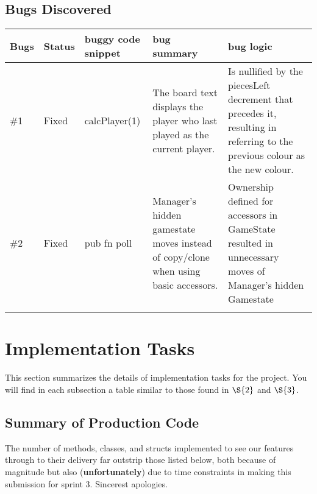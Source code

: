 \documentclass[11pt]{article}
\begin{document}
\subsection{Bugs Discovered}
\label{sec:org132d938}
\begin{center}
\begin{tabular}{|l|l|m{2.0cm}|m{3.5cm}|m{5.0cm}|}
Bugs & Status & buggy code snippet & bug summary & bug logic\\
\hline
\#1 & Fixed & calcPlayer(1) & The board text displays the player who last played as the current player. & Is nullified by the piecesLeft decrement that precedes it, resulting in referring to the previous colour as the new colour.\\
\hline
\#2 & Fixed & pub fn poll & Manager's hidden gamestate moves instead of copy/clone when using basic accessors. & Ownership defined for accessors in GameState resulted in unnecessary moves of Manager's hidden Gamestate\\
 &  &  &  & \\
\end{tabular}
\end{center}

\section{Implementation Tasks}
\label{sec:org1f9c042}
This section summarizes the details of implementation tasks for the project. You will find in each
subsection a table similar to those found in \hyperref[sec:org7807149]{\(\S{2}\)} and \hyperref[sec:orgb298c6a]{\(\S{3}\)}.

\subsection{Summary of Production Code}
\label{sec:org08408a6}

The number of methods, classes, and structs implemented to see our features through to their
delivery far outstrip those listed below, both because of magnitude but also (\textbf{unfortunately}) due
to time constraints in making this submission for sprint 3. Sincerest apologies.
\end{document}

